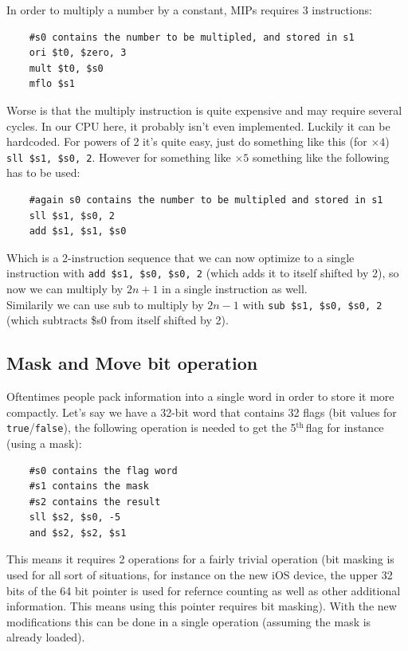 \documentclass[11pt]{article} %
\newcommand{\code}[1]{\texttt{#1}}
\newcommand{\nth}{$^{\text{th}\ }$}
\begin{document}
In order to multiply a number by a constant, MIPs requires 3 instructions:

\begin{verbatim}
    #s0 contains the number to be multipled, and stored in s1
    ori $t0, $zero, 3
    mult $t0, $s0
    mflo $s1
\end{verbatim}

Worse is that the multiply instruction is quite expensive and may require several cycles. In our CPU here, it probably isn't even implemented. Luckily it can be hardcoded. For powers of 2 it's quite easy, just do something like this (for $\times 4$) \code{sll \$s1, \$s0, 2}. However for something like $\times 5$ something like the following has to be used:

\begin{verbatim}
    #again s0 contains the number to be multipled and stored in s1
    sll $s1, $s0, 2
    add $s1, $s1, $s0
\end{verbatim}

Which is a 2-instruction sequence that we can now optimize to a single instruction with \code{add \$s1, \$s0, \$s0, 2} (which adds it to itself shifted by 2), so now we can multiply by $2n+1$ in a single instruction as well.\\

Similarily we can use sub to multiply by $2n-1$ with \code{sub \$s1, \$s0, \$s0, 2} (which subtracts \$s0 from itself shifted by 2).

\subsection{Mask and Move bit operation}

Oftentimes people pack information into a single word in order to store it more compactly. Let's say we have a 32-bit word that contains 32 flags (bit values for \code{true}/\code{false}), the following operation is needed to get the 5\nth flag for instance (using a mask):

\begin{verbatim}
    #s0 contains the flag word
    #s1 contains the mask
    #s2 contains the result
    sll $s2, $s0, -5
    and $s2, $s2, $s1
\end{verbatim}

This means it requires 2 operations for a fairly trivial operation (bit masking is used for all sort of situations, for instance on the new iOS device, the upper 32 bits of the 64 bit pointer is used for refernce counting as well as other additional information. This means using this pointer requires bit masking). With the new modifications this can be done in a single operation (assuming the mask is already loaded).
\end{document}
